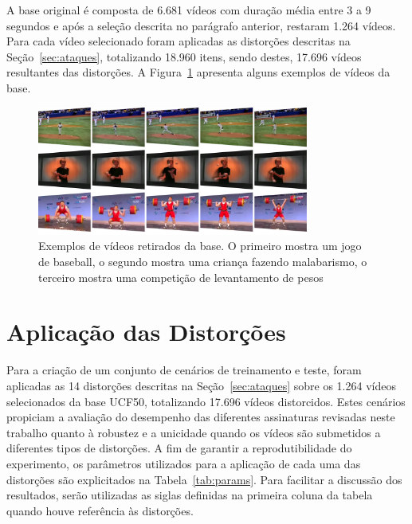 A base original é composta de 6.681 vídeos com duração média entre 3 a 9 segundos e após a seleção descrita no parágrafo anterior, restaram 1.264 vídeos. Para cada vídeo selecionado foram aplicadas as distorções descritas na Seção~\ref{sec:ataques}, totalizando 18.960 itens, sendo destes, 17.696 vídeos resultantes das distorções. A Figura~\ref{fig:exemplos} apresenta alguns exemplos de vídeos da base.

\begin{figure}
    \centering
    \caption{Exemplos de vídeos retirados da base. O primeiro mostra um jogo de baseball, o segundo mostra uma criança fazendo malabarismo, o terceiro mostra uma competição de levantamento de pesos}
    \label{fig:exemplos}
    \includegraphics[width=0.8\textwidth]{dados/figuras/exemplos}
\end{figure}

\section{Aplicação das Distorções}
\label{sec:met-distorcoes}

Para a criação de um conjunto de cenários de treinamento e teste, foram aplicadas as 14 distorções descritas na Seção~\ref{sec:ataques} sobre os 1.264 vídeos selecionados da base UCF50, totalizando 17.696 vídeos distorcidos. Estes cenários propiciam a avaliação do desempenho das diferentes assinaturas revisadas neste trabalho quanto à robustez e a unicidade quando os vídeos são submetidos a diferentes tipos de distorções. A fim de garantir a reprodutibilidade do experimento, os parâmetros utilizados para a aplicação de cada uma das distorções são explicitados na Tabela~\ref{tab:params}. Para facilitar a discussão dos resultados, serão utilizadas as siglas definidas na primeira coluna da tabela quando houve referência às distorções.

